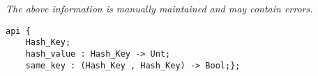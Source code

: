 \label{api:Hash\_Key}

{\tiny \it The above information is manually maintained and may contain errors.}
\begin{verbatim}
api {
    Hash_Key;
    hash_value : Hash_Key -> Unt;
    same_key : (Hash_Key , Hash_Key) -> Bool;};
\end{verbatim}
